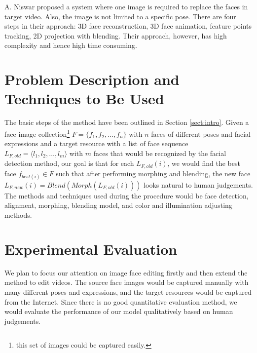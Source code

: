 \documentclass[10pt,letterpaper]{article}
\begin{document}
A. Niswar \cite{niswar2012face} proposed a system where one image is required to replace the faces in target video. Also, the image is not limited to a specific pose. There are four steps in their approach: 3D face reconstruction, 3D face animation, feature points tracking, 2D projection with blending. Their approach, however, has high complexity and hence high time consuming. 
\section{Problem Description and Techniques to Be Used}

%
The basic steps of the method have been outlined in Section \ref{sect:intro}. Given a face image collection{\footnote[1]{this set of images could be captured easily.}} $F = \{f_1, f_2, \dots, f_n\}$ with $n$ faces of different poses and facial expressions and a target resource with a list of face sequence $L_{F,old} = \langle l_1, l_2, \dots, l_m \rangle$ with $m$ faces that would be recognized by the facial detection method, our goal is that for each $L_{F, old}(i)$, we would find the best face $f_{best(i)} \in F$ such that after performing morphing and blending, the new face
$L_{F, new}(i) = Blend(Morph(L_{F, old}(i)))$ looks natural to human judgements. The methods and techniques used during the procedure would be face detection, alignment, morphing, blending model, and color and illumination adjusting methods.

\section{Experimental Evaluation}
 


We plan to focus our attention on image face editing firstly and then extend the method to edit videos. The source face images would be captured manually with many different poses and expressions, and the target resources would be captured from the Internet. Since there is no good quantitative evaluation method, we would evaluate the performance of our model qualitatively based on human judgements.
\end{document}
